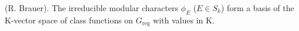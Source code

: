 (R. Brauer). The irreducible modular characters $\phi_E$ ($E \in S_k$) form a basis of the K-vector space of class functions on $G_{\text{reg}}$ with values in K.
